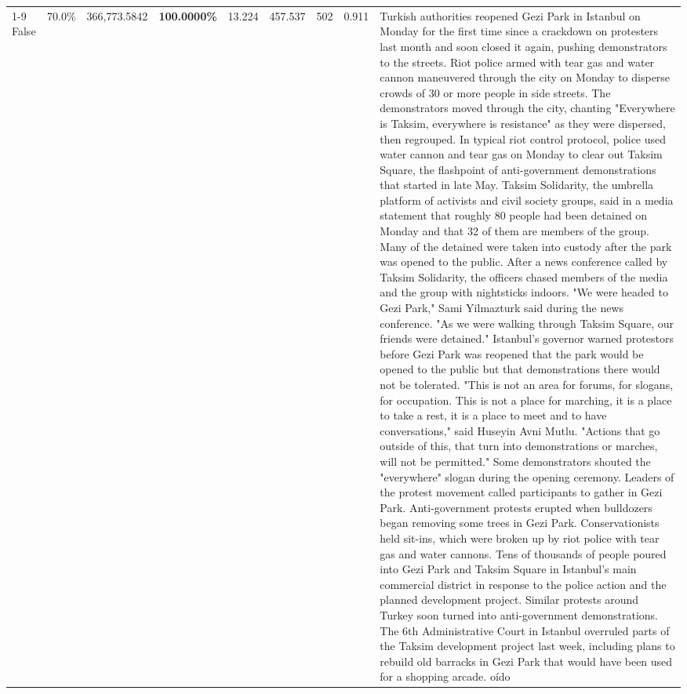 \begin{table}[H]
\begin{tabular}{lllrlllll}
\cline{1-9}
False & 70.0\% & 366,773.5842 & \bfseries \color{red} 100.0000\% & 13.224 & 457.537 & 502 & 0.911 & Turkish authorities reopened Gezi Park in Istanbul on Monday for the first time since a crackdown on protesters last month and soon closed it again, pushing demonstrators to the streets. Riot police armed with tear gas and water cannon maneuvered through the city on Monday to disperse crowds of 30 or more people in side streets. The demonstrators moved through the city, chanting "Everywhere is Taksim, everywhere is resistance" as they were dispersed, then regrouped. In typical riot control protocol, police used water cannon and tear gas on Monday to clear out Taksim Square, the flashpoint of anti-government demonstrations that started in late May. Taksim Solidarity, the umbrella platform of activists and civil society groups, said in a media statement that roughly 80 people had been detained on Monday and that 32 of them are members of the group. Many of the detained were taken into custody after the park was opened to the public. After a news conference called by Taksim Solidarity, the officers chased members of the media and the group with nightsticks indoors. "We were headed to Gezi Park," Sami Yilmazturk said during the news conference. "As we were walking through Taksim Square, our friends were detained." Istanbul's governor warned protestors before Gezi Park was reopened that the park would be opened to the public but that demonstrations there would not be tolerated. "This is not an area for forums, for slogans, for occupation. This is not a place for marching, it is a place to take a rest, it is a place to meet and to have conversations," said Huseyin Avni Mutlu. "Actions that go outside of this, that turn into demonstrations or marches, will not be permitted." Some demonstrators shouted the "everywhere" slogan during the opening ceremony. Leaders of the protest movement called participants to gather in Gezi Park. Anti-government protests erupted when bulldozers began removing some trees in Gezi Park. Conservationists held sit-ins, which were broken up by riot police with tear gas and water cannons. Tens of thousands of people poured into Gezi Park and Taksim Square in Istanbul's main commercial district in response to the police action and the planned development project. Similar protests around Turkey soon turned into anti-government demonstrations. The 6th Administrative Court in Istanbul overruled parts of the Taksim development project last week, including plans to rebuild old barracks in Gezi Park that would have been used for a shopping arcade. oído \\

\end{tabular}
\end{table}
